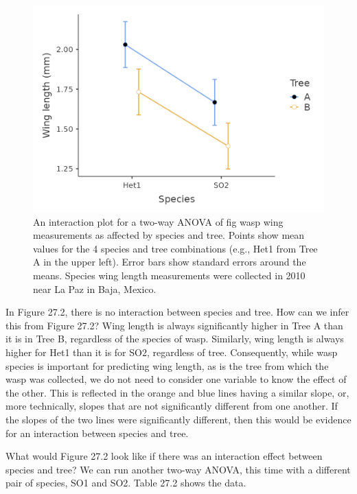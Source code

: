 \documentclass[
  openany]{krantz}
\begin{document}
\begin{figure}
\includegraphics[width=1\linewidth]{img/two-way_ANOVA_no_interaction} \caption{An interaction plot for a two-way ANOVA of fig wasp wing measurements as affected by species and tree. Points show mean values for the 4 species and tree combinations (e.g., Het1 from Tree A in the upper left). Error bars show standard errors around the means. Species wing length measurements were collected in 2010 near La Paz in Baja, Mexico.}\label{fig:unnamed-chunk-108}
\end{figure}

In Figure 27.2, there is no interaction between species and tree.
How can we infer this from Figure 27.2?
Wing length is always significantly higher in Tree A than it is in Tree B, regardless of the species of wasp.
Similarly, wing length is always higher for Het1 than it is for SO2, regardless of tree.
Consequently, while wasp species is important for predicting wing length, as is the tree from which the wasp was collected, we do not need to consider one variable to know the effect of the other.
This is reflected in the orange and blue lines having a similar slope, or, more technically, slopes that are not significantly different from one another.
If the slopes of the two lines were significantly different, then this would be evidence for an interaction between species and tree.

What would Figure 27.2 look like if there was an interaction effect between species and tree?
We can run another two-way ANOVA, this time with a different pair of species, SO1 and SO2.
Table 27.2 shows the data.
\end{document}
